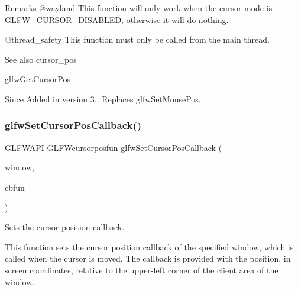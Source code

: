 \begin{DoxyRemark}{Remarks}
@wayland This function will only work when the cursor mode is {\ttfamily G\+L\+F\+W\+\_\+\+C\+U\+R\+S\+O\+R\+\_\+\+D\+I\+S\+A\+B\+L\+ED}, otherwise it will do nothing.
\end{DoxyRemark}
@thread\+\_\+safety This function must only be called from the main thread.

\begin{DoxySeeAlso}{See also}
cursor\+\_\+pos 

\mbox{\hyperlink{group__input_gad289438eb7cf53d11eca685373f44105}{glfw\+Get\+Cursor\+Pos}}
\end{DoxySeeAlso}
\begin{DoxySince}{Since}
Added in version 3.. Replaces {\ttfamily glfw\+Set\+Mouse\+Pos}. 
\end{DoxySince}
\mbox{\label{group__input_ga9c49c0d3d3c775c3124726f1d902124d}} 
\subsubsection{\texorpdfstring{glfwSetCursorPosCallback()}{glfwSetCursorPosCallback()}}
{\footnotesize\ttfamily \mbox{\hyperlink{glfw3_8h_a56da5036b2cc259351ae22fd6439bb47}{G\+L\+F\+W\+A\+PI}} \mbox{\hyperlink{group__input_ga4cfad918fa836f09541e7b9acd36686c}{G\+L\+F\+Wcursorposfun}} glfw\+Set\+Cursor\+Pos\+Callback (\begin{DoxyParamCaption}\item[{\mbox{\hyperlink{group__window_ga3c96d80d363e67d13a41b5d1821f3242}{G\+L\+F\+Wwindow}} $\ast$}]{window,  }\item[{\mbox{\hyperlink{group__input_ga4cfad918fa836f09541e7b9acd36686c}{G\+L\+F\+Wcursorposfun}}}]{cbfun }\end{DoxyParamCaption})}



Sets the cursor position callback. 

This function sets the cursor position callback of the specified window, which is called when the cursor is moved. The callback is provided with the position, in screen coordinates, relative to the upper-\/left corner of the client area of the window.


